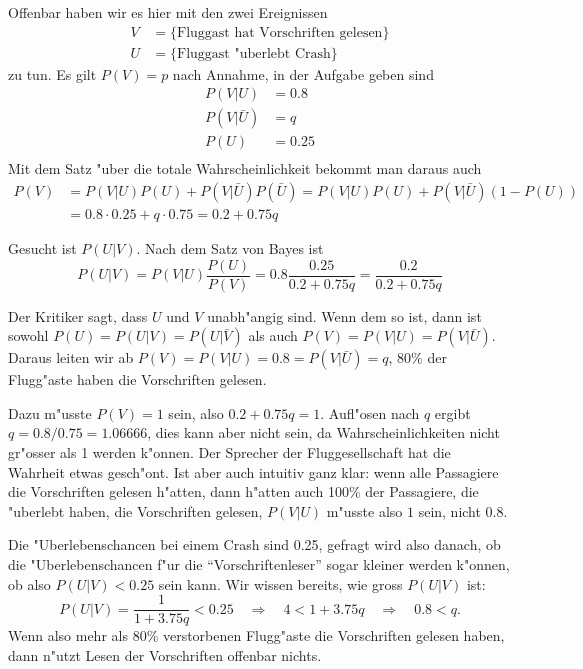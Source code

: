 \begin{loesung}
Offenbar haben wir es hier mit den zwei Ereignissen
\begin{align*}
V&=\{\text{Fluggast hat Vorschriften gelesen}\}
\\
U&=\{\text{Fluggast "uberlebt Crash}\}
\end{align*}
zu tun. Es gilt $P(V)=p$ nach Annahme, in der Aufgabe geben sind
\begin{align*}
P(V|U)&=0.8\\
P(V|\bar U)&=q\\
P(U)&=0.25\\
\end{align*}
Mit dem Satz "uber die totale Wahrscheinlichkeit bekommt man daraus auch
\begin{align*}
P(V)
&=
P(V|U)P(U)+P(V|\bar U)P(\bar U)
=
P(V|U)P(U)+P(V|\bar U)(1-P(U))
\\
&=
0.8\cdot0.25 +q\cdot 0.75
=0.2+ 0.75q
\end{align*}
\begin{teilaufgaben}
\item
Gesucht ist $P(U|V)$.
Nach dem Satz von Bayes ist
\begin{equation}
P(U|V)=P(V|U)\frac{P(U)}{P(V)}
=0.8 \frac{0.25}{0.2+0.75q}
=\frac{0.2}{0.2+0.75q}
\label{pq}
\end{equation}
\item
Der Kritiker sagt, dass $U$ und $V$ unabh"angig sind. Wenn dem so
ist, dann ist sowohl
$P(U)=P(U|V)=P(U|\bar V)$
als auch
$P(V)=P(V|U)=P(V|\bar U)$.
Daraus leiten wir ab $P(V)=P(V|U)=0.8=P(V|\bar U)=q$, 80\% der
Flugg"aste haben die Vorschriften gelesen.
\item
Dazu m"usste $P(V)=1$ sein, also
$0.2+0.75q=1$.
Aufl"osen nach $q$ ergibt $q=0.8/0.75=1.06666$, dies kann aber nicht
sein, da Wahrscheinlichkeiten nicht gr"osser als 1 werden k"onnen.
Der Sprecher der Fluggesellschaft hat die Wahrheit etwas gesch"ont.
Ist aber auch intuitiv ganz klar: wenn alle Passagiere die Vorschriften
gelesen h"atten, dann h"atten auch 100\% der Passagiere, die
"uberlebt haben, die Vorschriften gelesen, $P(V|U)$ m"usste also $1$
sein, nicht $0.8$.
\item
Die "Uberlebenschancen bei einem Crash sind 0.25, gefragt wird
also danach, ob die "Uberlebenschancen f"ur die ``Vorschriftenleser''
sogar kleiner werden k"onnen, ob also $P(U|V)<0.25$ sein kann. Wir
wissen bereits, wie gross
$P(U|V)$ ist:
\[
P(U|V)=\frac{1}{1+3.75q}<0.25
\quad
\Rightarrow
\quad
4<1+3.75q
\quad
\Rightarrow
\quad
0.8<q.
\]
Wenn also mehr als 80\% verstorbenen Flugg"aste die Vorschriften
gelesen haben, dann n"utzt Lesen der Vorschriften offenbar
nichts.
\qedhere
\end{teilaufgaben}
\end{loesung}

